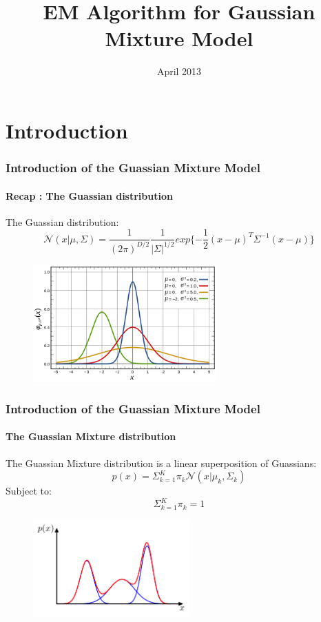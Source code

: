 \documentclass{beamer}
\title{EM Algorithm for Gaussian Mixture Model}
\date{April 2013}
\begin{document}
\begin{frame}
\titlepage
\end{frame}

\section{Introduction}

\begin{frame}
\frametitle{Introduction of the Guassian Mixture Model}
\framesubtitle{Recap : The Guassian distribution}
The Guassian distribution:
\begin{equation}
\mathcal{N}(x | \mu, \Sigma) = \frac{1}{(2\pi)^{D/2}}\frac{1}{|\Sigma|^{1/2}}exp\{-\frac{1}{2}(x-\mu)^T\Sigma^{-1}(x-\mu)\}
\end{equation}
\begin{figure}
\includegraphics[width=200pt]{Guassian.png}
\end{figure}
\end{frame}

\begin{frame}
\frametitle{Introduction of the Guassian Mixture Model}
\framesubtitle{The Guassian Mixture distribution}
The Guassian Mixture distribution is a linear superposition of Guassians: 
\begin{equation}
p(x) = \Sigma^K_{k=1}\pi_k\mathcal{N}(x|\mu_k,\Sigma_k)
\end{equation}
Subject to:
\begin{equation}
\Sigma^K_{k=1}\pi_k = 1
\end{equation}
\begin{figure}
\includegraphics[width=170pt]{GMM-example2.png}\\
\end{figure}
\end{frame}
\end{document}
